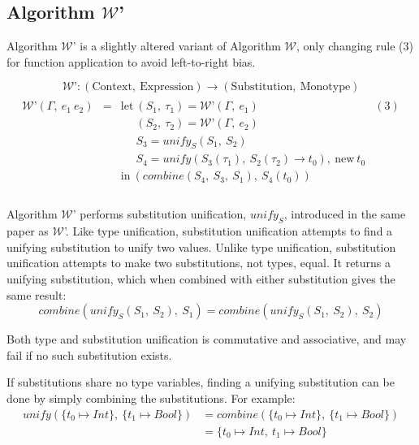 \documentclass[a4paper,fleqn,oneside,12pt]{report}
\newcommand{\W}{$\mathcal{W}$}
\begin{document}
\subsection{Algorithm \texorpdfstring{\W}{W}'}

Algorithm \W’ is a slightly altered variant of Algorithm \W, only changing rule (3) for function application to avoid left-to-right bias.

$$
\mathcal{W}\textrm{'}: (\mathrm{Context},\ \mathrm{Expression}) \rightarrow (\mathrm{Substitution},\ \mathrm{Monotype})
$$$$
\begin{array}{lclc}
  \\
    \mathcal{W}\textrm{'}(\Gamma,\ e_1\ e_2) & = & \textrm{let}\ (S_1,\ \tau_1) = \mathcal{W}\textrm{'}(\Gamma,\ e_1) & (3)\\
                                             &   & \phantom{\textrm{let}}\ (S_2,\ \tau_2) = \mathcal{W}\textrm{'}(\Gamma,\ e_2) &\\
                                             &   & \phantom{\textrm{let}}\ S_3 = \mathit{unify_S}(S_1,\ S_2) &\\
                                             &   & \phantom{\textrm{let}}\ S_4 = \mathit{unify}(S_3(\tau_1),\ S_2(\tau_2) \rightarrow t_0),\ \textrm{new}\ t_0 &\\
                                             &   & \textrm{in}\ (\mathit{combine}(S_4,\ S_3,\ S_1),\ S_4(t_0)) &\\
  \\
\end{array}
$$

Algorithm \W' performs substitution unification, $\mathit{unify_S}$, introduced in the same paper as \W'. Like type unification, substitution unification attempts to find a unifying substitution to unify two values. Unlike type unification, substitution unification attempts to make two substitutions, not types, equal. It returns a unifying substitution, which when combined with either substitution gives the same result:
$$\mathit{combine}(\mathit{unify_S}(S_1,\ S_2),\ S_1) = \mathit{combine}(\mathit{unify_S}(S_1,\ S_2),\ S_2)$$

Both type and substitution unification is commutative and associative, and may fail if no such substitution exists.

If substitutions share no type variables, finding a unifying substitution can be done by simply combining the substitutions. For example:
\begin{align*}
  \mathit{unify}(\{ t_0 \mapsto Int \},\ \{ t_1 \mapsto Bool \}) & = \mathit{combine}(\{ t_0 \mapsto Int \},\ \{ t_1 \mapsto Bool \})\\
                                                                 & = \{ t_0 \mapsto Int,\ t_1 \mapsto Bool \}
\end{align*}
\end{document}
